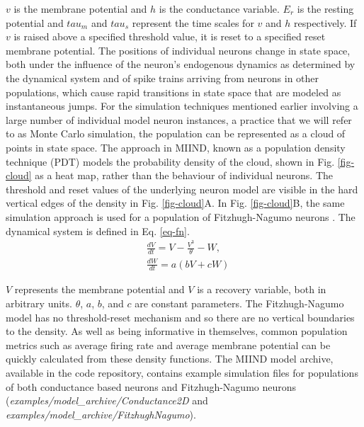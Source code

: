 \documentclass[utf8]{frontiersSCNS} %
\begin{document}
$v$ is the membrane potential and $h$ is the conductance variable. $E_r$ is the resting potential and $tau_m$ and $tau_s$ represent the time scales for $v$ and $h$ respectively. If $v$ is raised above a specified threshold value, it is reset to a specified reset membrane potential.
The positions of individual neurons change in state space, both under the influence of the neuron's endogenous dynamics as determined by the dynamical system and of spike trains arriving from neurons in other populations, which cause rapid transitions in state space that are modeled as instantaneous jumps. For the simulation techniques mentioned earlier involving a large number of individual model neuron instances, a practice that we will refer to as Monte Carlo simulation, the population can be represented as a cloud of points in state space. The approach in MIIND, known as a population density technique (PDT) models the probability density of the cloud, shown in Fig. \ref{fig-cloud} as a heat map, rather than the behaviour of individual neurons. The threshold and reset values of the underlying neuron model are visible in the hard vertical edges of the density in Fig. \ref{fig-cloud}A. In Fig. \ref{fig-cloud}B, the same simulation approach is used for a population of Fitzhugh-Nagumo neurons \citep{fitzhugh1961impulses,nagumo1962active}. The dynamical system is defined in Eq. \ref{eq-fn}. 
\begin{equation}
\begin{aligned}
&\frac{dV}{dt} = V - \frac{V^3}{\theta} - W, \\
&\frac{dW}{dt} = a(bV + cW)
\label{eq-fn}
\end{aligned}
\end{equation}

$V$ represents the membrane potential and $V$ is a recovery variable, both in arbitrary units. $\theta$, $a$, $b$, and $c$ are constant parameters. The Fitzhugh-Nagumo model has no threshold-reset mechanism and so there are no vertical boundaries to the density. As well as being informative in themselves, common population metrics such as average firing rate and average membrane potential can be quickly calculated from these density functions. The MIIND model archive, available in the code repository, contains example simulation files for populations of both conductance based neurons and Fitzhugh-Nagumo neurons (\textit{examples/model\_archive/Conductance2D} and \textit{examples/model\_archive/FitzhughNagumo}).
\end{document}
